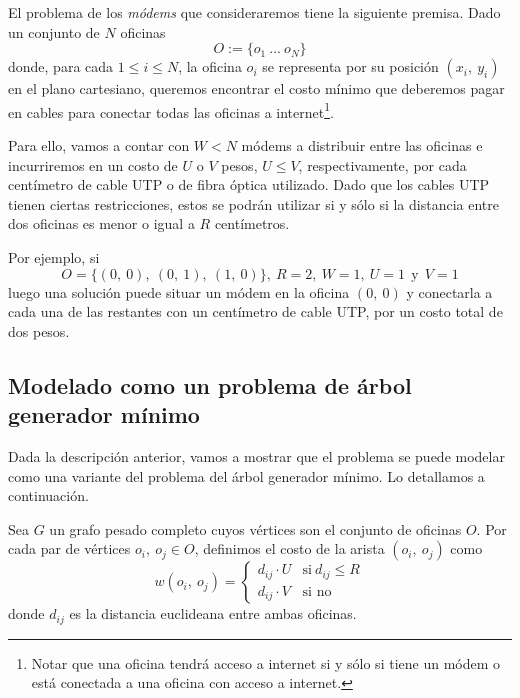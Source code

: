 El problema de los \textit{módems} que consideraremos tiene la siguiente premisa. Dado un conjunto de $N$ oficinas 
\begin{equation*}
    O := \{o_1\ ...\ o_N\}    
\end{equation*}
donde, para cada $1 \leq i \leq N$, la oficina $o_i$ se representa por su posición $(x_i,\ y_i)$ en el plano cartesiano, queremos encontrar el costo mínimo que deberemos pagar en cables para conectar todas las oficinas a internet\footnote{Notar que una oficina tendrá acceso a internet si y sólo si tiene un módem o está conectada a una oficina con acceso a internet.}.

Para ello, vamos a contar con $W < N$ módems a distribuir entre las oficinas e incurriremos en un costo de $U$ o $V$ pesos, $U \leq V$, respectivamente, por cada centímetro de cable UTP o de fibra óptica utilizado. Dado que los cables UTP tienen ciertas restricciones, estos se podrán utilizar si y sólo si la distancia entre dos oficinas es menor o igual a $R$ centímetros. 

Por ejemplo, si
\begin{equation*}
    O = \{(0,\ 0),\ (0,\ 1),\ (1,\ 0)\},\ R = 2,\ W = 1,\ U = 1\ \: \text{y}\ \: V = 1  
\end{equation*} 
luego una solución puede situar un módem en la oficina $(0,\ 0)$ y conectarla a cada una de las restantes con un centímetro de cable UTP, por un costo total de dos pesos.

\subsection{Modelado como un problema de árbol generador mínimo}

Dada la descripción anterior, vamos a mostrar que el problema se puede modelar como una variante del problema del árbol generador mínimo. Lo detallamos a continuación.

Sea $G$ un grafo pesado completo cuyos vértices son el conjunto de oficinas $O$. Por cada par de vértices $o_i,\ o_j \in O$, definimos el costo de la arista $(o_i,\ o_j)$ como
\begin{equation*}
    w(o_i,\ o_j) = \begin{cases}
        d_{ij} \cdot U &\text{si}\ d_{ij} \leq R \\
        d_{ij} \cdot V & \text{si no}
    \end{cases}
\end{equation*}
donde $d_{ij}$ es la distancia euclideana entre ambas oficinas. 


